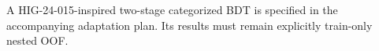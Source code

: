 A HIG-24-015-inspired two-stage categorized BDT is specified in the accompanying adaptation plan. Its results must remain explicitly train-only nested OOF.
